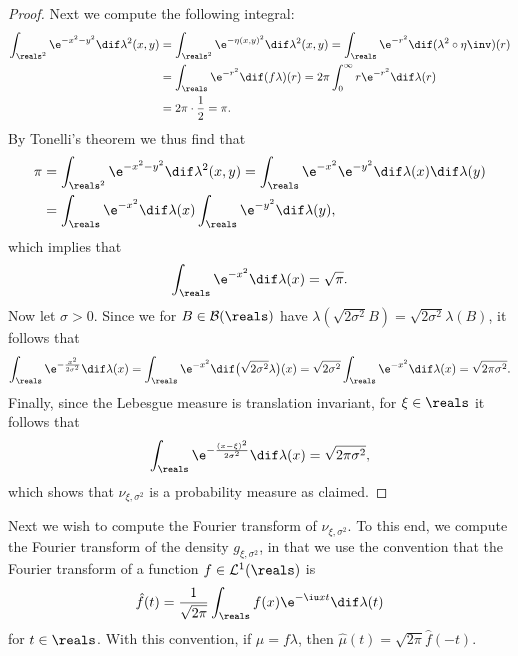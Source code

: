 \documentclass[article, a4paper, 11pt, oneside]{memoir}
\numberwithin{equation}{chapter}
\newcommand{\calL}{\mathcal{L}}
\newcommand{\borel}{\mathcal{B}}
\begin{document}
\begin{proof}
    Next we compute the following integral:
    \begin{align*}
        \int_{\reals^2} \e^{-x^2 - y^2} \dif \lambda^2(x,y)
            &= \int_{\reals^2} \e^{-\eta(x,y)^2} \dif \lambda^2(x,y)
             = \int_\reals \e^{-r^2} \dif (\lambda^2 \circ \eta\inv)(r) \\
            &= \int_\reals \e^{-r^2} \dif (f\lambda)(r)
             = 2\pi \int_0^\infty r \e^{-r^2} \dif \lambda(r) \\
            &= 2\pi \cdot \frac{1}{2}
             = \pi.
    \end{align*}
    By Tonelli's theorem we thus find that
    \begin{align*}
        \pi
            &= \int_{\reals^2} \e^{-x^2 - y^2} \dif \lambda^2(x,y)
             = \int_\reals \e^{-x^2} \e^{-y^2} \dif \lambda(x) \dif \lambda(y) \\
            &= \int_\reals \e^{-x^2} \dif \lambda(x) \int_\reals \e^{-y^2} \dif \lambda(y),
    \end{align*}
    which implies that
    \begin{equation*}
        \int_\reals \e^{-x^2} \dif \lambda(x)
            = \sqrt{\pi}.
    \end{equation*}
    Now let $\sigma > 0$. Since we for $B \in \borel(\reals)$ have $\lambda(\sqrt{2\sigma^2} B) = \sqrt{2\sigma^2} \lambda(B)$, it follows that
    \begin{equation*}
        \int_\reals \e^{-\frac{x^2}{2\sigma^2}} \dif \lambda(x)
            = \int_\reals \e^{-x^2} \dif \bigl( \sqrt{2\sigma^2}\lambda \bigr)(x)
            = \sqrt{2\sigma^2} \int_\reals \e^{-x^2} \dif \lambda(x)
            = \sqrt{2\pi\sigma^2}.
    \end{equation*}
    Finally, since the Lebesgue measure is translation invariant, for $\xi \in \reals$ it follows that
    \begin{equation*}
        \int_\reals \e^{-\frac{(x-\xi)^2}{2\sigma^2}} \dif \lambda(x)
            = \sqrt{2\pi\sigma^2},
    \end{equation*}
    which shows that $\nu_{\xi,\sigma^2}$ is a probability measure as claimed.
\end{proof}

Next we wish to compute the Fourier transform of $\nu_{\xi,\sigma^2}$. To this end, we compute the Fourier transform of the density $g_{\xi,\sigma^2}$, in that we use the convention that the Fourier transform of a function $f \in \calL^1(\reals)$ is
%
\begin{equation*}
    \hat{f}(t)
        = \frac{1}{\sqrt{2\pi}} \int_\reals f(x) \e^{-\iu xt} \dif\lambda(t)
\end{equation*}
%
for $t \in \reals$. With this convention, if $\mu = f \lambda$, then $\hat{\mu}(t) = \sqrt{2\pi} \hat{f}(-t)$.
\end{document}
